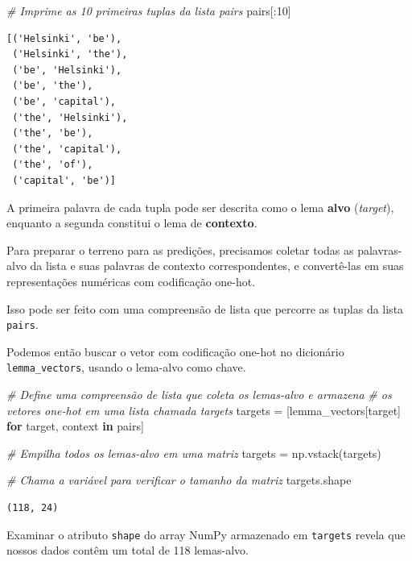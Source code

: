\documentclass[
  brazilian,
]{article}
\newenvironment{Shaded}{}{}
\newcommand{\CommentTok}[1]{\textcolor[rgb]{0.38,0.63,0.69}{\textit{#1}}}
\newcommand{\ControlFlowTok}[1]{\textcolor[rgb]{0.00,0.44,0.13}{\textbf{#1}}}
\newcommand{\DecValTok}[1]{\textcolor[rgb]{0.25,0.63,0.44}{#1}}
\newcommand{\KeywordTok}[1]{\textcolor[rgb]{0.00,0.44,0.13}{\textbf{#1}}}
\newcommand{\NormalTok}[1]{#1}
\newcommand{\OperatorTok}[1]{\textcolor[rgb]{0.40,0.40,0.40}{#1}}
\begin{document}
\begin{Shaded}
\begin{Highlighting}[]
\CommentTok{\# Imprime as 10 primeiras tuplas da lista \textquotesingle{}pairs\textquotesingle{}}
\NormalTok{pairs[:}\DecValTok{10}\NormalTok{]}
\end{Highlighting}
\end{Shaded}

\begin{verbatim}
[('Helsinki', 'be'),
 ('Helsinki', 'the'),
 ('be', 'Helsinki'),
 ('be', 'the'),
 ('be', 'capital'),
 ('the', 'Helsinki'),
 ('the', 'be'),
 ('the', 'capital'),
 ('the', 'of'),
 ('capital', 'be')]
\end{verbatim}

A primeira palavra de cada tupla pode ser descrita como o lema
\textbf{alvo} (\emph{target}), enquanto a segunda constitui o lema de
\textbf{contexto}.

Para preparar o terreno para as predições, precisamos coletar todas as
palavras-alvo da lista e suas palavras de contexto correspondentes, e
convertê-las em suas representações numéricas com codificação one-hot.

Isso pode ser feito com uma compreensão de lista que percorre as tuplas
da lista \texttt{pairs}.

Podemos então buscar o vetor com codificação one-hot no dicionário
\texttt{lemma\_vectors}, usando o lema-alvo como chave.

\begin{Shaded}
\begin{Highlighting}[]
\CommentTok{\# Define uma compreensão de lista que coleta os lemas{-}alvo e armazena}
\CommentTok{\# os vetores one{-}hot em uma lista chamada \textquotesingle{}targets\textquotesingle{}}
\NormalTok{targets }\OperatorTok{=}\NormalTok{ [lemma\_vectors[target] }\ControlFlowTok{for}\NormalTok{ target, context }\KeywordTok{in}\NormalTok{ pairs]}

\CommentTok{\# Empilha todos os lemas{-}alvo em uma matriz}
\NormalTok{targets }\OperatorTok{=}\NormalTok{ np.vstack(targets)}

\CommentTok{\# Chama a variável para verificar o tamanho da matriz}
\NormalTok{targets.shape}
\end{Highlighting}
\end{Shaded}

\begin{verbatim}
(118, 24)
\end{verbatim}

Examinar o atributo \texttt{shape} do array NumPy armazenado em
\texttt{targets} revela que nossos dados contêm um total de 118
lemas-alvo.
\end{document}
